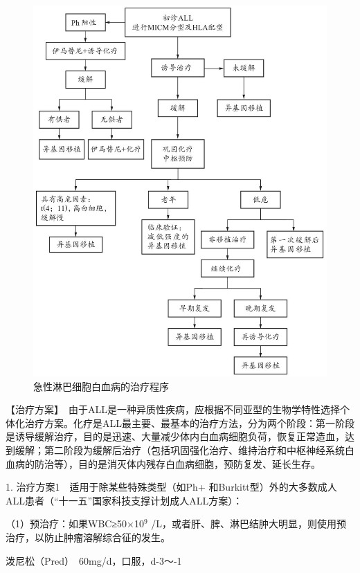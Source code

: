 \begin{figure}[!htbp]
 \centering
 \includegraphics{./images/Image00145.jpg}
 \captionsetup{justification=centering}
 \caption{急性淋巴细胞白血病的治疗程序}
 \label{fig5-1-12}
  \end{figure} 

【治疗方案】　由于ALL是一种异质性疾病，应根据不同亚型的生物学特性选择个体化治疗方案。化疗是ALL最主要、最基本的治疗方法，分为两个阶段：第一阶段是诱导缓解治疗，目的是迅速、大量减少体内白血病细胞负荷，恢复正常造血，达到缓解；第二阶段为缓解后治疗（包括巩固强化治疗、维持治疗和中枢神经系统白血病的防治等），目的是消灭体内残存白血病细胞，预防复发、延长生存。

1. 治疗方案1　适用于除某些特殊类型（如Ph{+}
和Burkitt型）外的大多数成人ALL患者（“十一五”国家科技支撑计划成人ALL方案）：

（1）预治疗：如果WBC≥50×10$^{9}$
/L，或者肝、脾、淋巴结肿大明显，则使用预治疗，以防止肿瘤溶解综合征的发生。

泼尼松（Pred）　60mg/d，口服，d-3～-1

